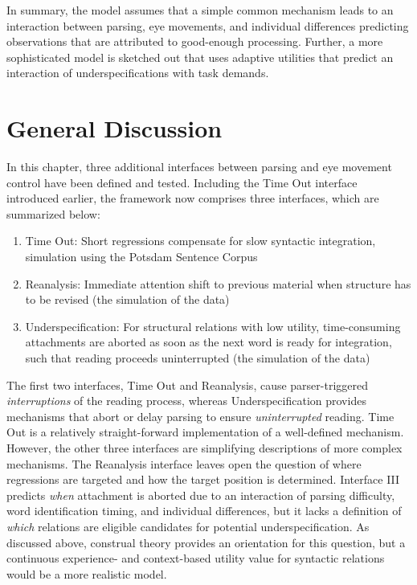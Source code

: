 \documentclass{cambridge7A}\usepackage[]{graphicx}\usepackage[]{color}
\begin{document}
In summary, the model assumes that a simple common mechanism leads to an interaction between parsing, eye movements, and individual differences predicting observations that are attributed to good-enough processing. Further, a more sophisticated model is sketched out that uses adaptive utilities that predict an interaction of underspecifications with task demands.


\section{General Discussion}
In this chapter, three additional interfaces between parsing and eye movement control have been defined and tested. Including the Time Out interface introduced earlier, the framework now comprises three interfaces, which are summarized below:

\begin{enumerate}
\item Time Out: Short regressions compensate for slow syntactic integration, simulation using the Potsdam Sentence Corpus
\item Reanalysis: Immediate attention shift to previous material when structure has to be revised (the simulation of the \cite{Staub2010a} data)
\item Underspecification: For structural relations with low utility, time-consuming attachments are aborted as soon as the next word is ready for integration, such that reading proceeds uninterrupted (the simulation of the \cite{MalsburgVasishth2013} data)
\end{enumerate}

The first two interfaces, Time Out and Reanalysis, cause parser-triggered \emph{interruptions} of the reading process, whereas Underspecification provides mechanisms that abort or delay parsing to ensure \emph{uninterrupted} reading.
Time Out is a relatively straight-forward implementation of a well-defined mechanism. However, the other three interfaces are simplifying descriptions of more complex mechanisms. The Reanalysis interface leaves open the question of where regressions are targeted and how the target position is determined. 
Interface III predicts \emph{when} attachment is aborted due to an interaction of parsing difficulty, word identification timing, and individual differences, but it lacks a definition of \emph{which} relations are eligible candidates for potential underspecification. As discussed above, construal theory provides an orientation for this question, but a continuous experience- and context-based utility value for syntactic relations would be a more realistic model. 
\end{document}
